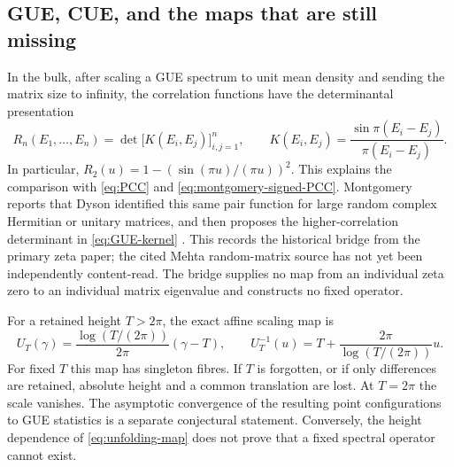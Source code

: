 \subsection{GUE, CUE, and the maps that are still missing}

In the bulk, after scaling a GUE spectrum to unit mean density and sending the matrix size to
infinity, the correlation functions have the determinantal presentation
\cite[random-matrix correlation discussion]{bogomolny2007}
\begin{equation}
 R_n(E_1,\dots,E_n)=\det\bigl[K(E_i,E_j)\bigr]_{i,j=1}^n,
 \qquad
 K(E_i,E_j)=\frac{\sin\pi(E_i-E_j)}{\pi(E_i-E_j)}.
 \label{eq:GUE-kernel}
\end{equation}
In particular, $R_2(u)=1-(\sin(\pi u)/(\pi u))^2$.  This explains the comparison with
\eqref{eq:PCC} and \eqref{eq:montgomery-signed-PCC}.  Montgomery reports that Dyson
identified this same pair function for large random complex Hermitian or unitary matrices,
and then proposes the higher-correlation determinant in \eqref{eq:GUE-kernel}
\cite[pp.~184--185, eqs.~(15)--(17)]{montgomery1973}.  This records
the historical bridge from the primary zeta paper; the cited Mehta random-matrix source has
not yet been independently content-read.  The bridge supplies no map from an individual
zeta zero to an individual matrix eigenvalue and constructs no fixed operator.

For a retained height $T>2\pi$, the exact affine scaling map is
\begin{equation}
 U_T(\gamma)=\frac{\log(T/(2\pi))}{2\pi}(\gamma-T),
 \qquad
 U_T^{-1}(u)=T+\frac{2\pi}{\log(T/(2\pi))}u.
 \label{eq:unfolding-map}
\end{equation}
For fixed $T$ this map has singleton fibres.  If $T$ is forgotten, or if only differences are
retained, absolute height and a common translation are lost.  At $T=2\pi$ the scale vanishes.
The asymptotic convergence of the resulting point configurations to GUE statistics is a
separate conjectural statement.  Conversely, the height dependence of
\eqref{eq:unfolding-map} does not prove that a fixed spectral operator cannot exist.

